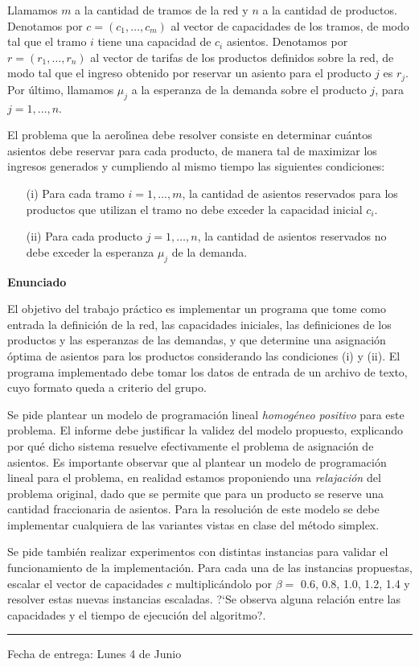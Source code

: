 Llamamos $m$ a la cantidad de tramos de la red y $n$ a la cantidad de
productos. Denotamos por $c = (c_1, \dots, c_m)$ al vector de capacidades
de los tramos, de modo tal que el tramo $i$ tiene una capacidad de $c_i$
asientos. Denotamos por $r = (r_1,\dots,r_n)$ al vector de tarifas de los
productos definidos sobre la red, de modo tal que el ingreso obtenido por
reservar un asiento para el producto $j$ es $r_j$. Por \'ultimo,
llamamos $\mu_j$ a la esperanza de la demanda sobre el producto $j$,
para $j=1,\dots,n$.

El problema que la aerol\'{\i}nea debe resolver consiste en determinar
cu\'antos asientos debe reservar para cada producto, de manera tal de
maximizar los ingresos generados y cumpliendo al mismo tiempo las siguientes
condiciones:
\vspace*{-5mm}
\begin{itemize}
\item[(i)] Para cada tramo $i=1,\dots,m$, la cantidad de asientos
reservados para los productos que utilizan el tramo no debe exceder la
capacidad inicial $c_i$.

\item[(ii)] Para cada producto $j=1,\dots,n$, la cantidad de asientos
reservados no debe exceder la esperanza $\mu_j$ de la demanda.
\end{itemize}

\textbf{Enunciado}

El objetivo del trabajo pr\'actico es implementar un programa que tome como
entrada la definici\'on de la red, las capacidades iniciales, las
definiciones de los productos y las esperanzas de las demandas, y que
determine una asignaci\'on \'optima de asientos para los productos
considerando las condiciones (i) y (ii). El programa implementado debe tomar
los datos de entrada de un archivo de texto, cuyo formato queda a criterio
del grupo.

Se pide plantear un modelo de programaci\'on lineal \emph{homog\'eneo
positivo} para este problema. El informe debe justificar la validez del
modelo propuesto, explicando por qu\'e dicho sistema resuelve efectivamente
el problema de asignaci\'on de asientos. Es importante observar que al
plantear un modelo de programaci\'on lineal para el problema, en realidad
estamos proponiendo una \emph{relajaci\'on} del problema original, dado que
se permite que para un producto se reserve una cantidad fraccionaria de
asientos. Para la resoluci\'on de este modelo se debe implementar cualquiera
de las variantes vistas en clase del m\'etodo simplex.

Se pide tambi\'en realizar experimentos con distintas instancias para validar
el funcionamiento de la implementaci\'on. Para cada una de las instancias
propuestas, escalar el vector de capacidades $c$ multiplic\'andolo por
$\beta =$ 0.6, 0.8, 1.0, 1.2, 1.4 y resolver estas nuevas instancias
escaladas. ?`Se observa alguna relaci\'on entre las capacidades y el
tiempo de ejecuci\'on del algoritmo?.

\vskip 15pt

\hrule

\vskip 11pt

Fecha de entrega: Lunes 4 de Junio


